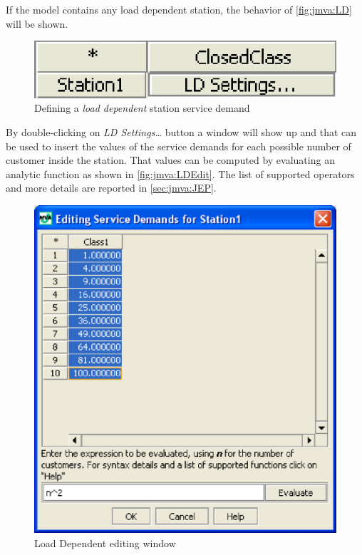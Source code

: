 If the model contains any load dependent station, the behavior of
\autoref{fig:jmva:LD} will be shown.
\begin{figure}[htbp]
    \begin{center}
        \includegraphics[scale=.5]{img/jmva/ld}
    \end{center}
    \caption{Defining a \emph{load dependent} station service demand}
    \label{fig:jmva:LD}
\end{figure}
By double-clicking on \emph{LD Settings\dots} button a window will
show up and that can be used to insert the values of the service
demands for each possible number of customer inside the station.
That values can be computed by evaluating an analytic function as
shown in \autoref{fig:jmva:LDEdit}. The list of supported operators
and more details are reported in \autoref{sec:jmva:JEP}.

\begin{figure}[htbp]
    \begin{center}
        \includegraphics[scale=.5]{img/jmva/ldEdit}
    \end{center}
    \caption{Load Dependent editing window}
    \label{fig:jmva:LDEdit}
\end{figure}

